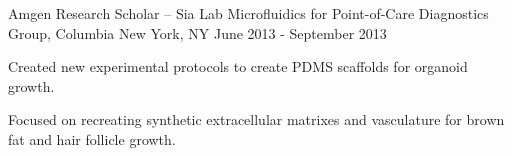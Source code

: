\begin{cventries}
 \cventry
    {Amgen Research Scholar -- Sia Lab} %
    {Microfluidics for Point-of-Care Diagnostics Group, Columbia} %
    {New York, NY} %
    {June 2013 - September 2013} %
    {
      \begin{cvitems} %
        \item {Created new experimental protocols to create PDMS scaffolds for organoid growth.}
        \item {Focused on recreating synthetic extracellular matrixes and vasculature for brown fat and hair follicle growth.}
      \end{cvitems}
    }

\end{cventries}
